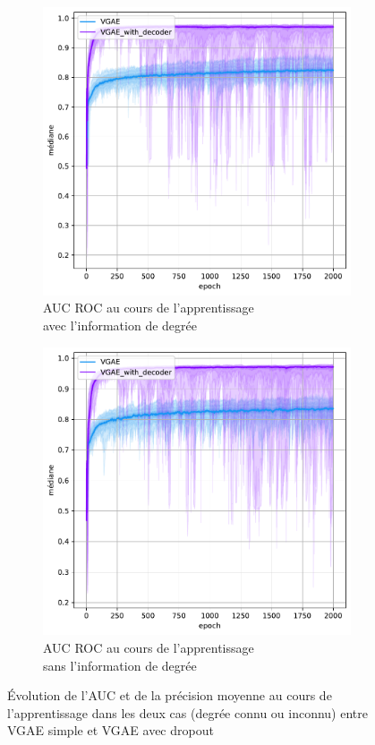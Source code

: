 \documentclass{article}
\begin{document}
\begin{figure}[H]
    \begin{subfigure}{0.45\textwidth}
      \includegraphics[width=\textwidth]{graphics/AUCs_degree_decoder_cinf.svg.pdf}
      \centering
      \caption{AUC ROC au cours de l'apprentissage\\ avec l'information de degrée}
    \end{subfigure}
    \begin{subfigure}{0.45\textwidth}
      \includegraphics[width=\textwidth]{graphics/AUCs_no_degree_decoder_cinf.svg.pdf}
      \centering
      \caption{AUC ROC au cours de l'apprentissage\\ sans l'information de degrée}
    \end{subfigure}
    \caption{Évolution de l'AUC et de la précision moyenne au cours de l'apprentissage dans les deux cas (degrée connu ou inconnu) entre VGAE simple et VGAE avec dropout}
    \label{fig:decoder}
\end{figure}
\end{document}
